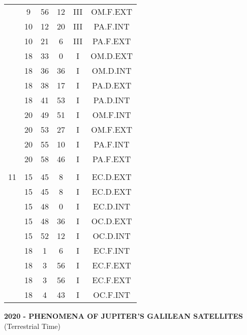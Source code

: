 \documentclass[12pt, a4paper]{article}
\begin{document}
\begin{multicols}{3}
{\begin{tabular}{c c c c c c}
	 	 	 	 & 9 & 56 & 12 & III & OM.F.EXT\\%
	 	 	 	 & 10 & 12 & 20 & III & PA.F.INT\\%
	 	 	 	 & 10 & 21 & 6 & III & PA.F.EXT\\%
	 	 	 	 & 18 & 33 & 0 & I & OM.D.EXT\\%
	 	 	 	 & 18 & 36 & 36 & I & OM.D.INT\\%
	 	 	 	 & 18 & 38 & 17 & I & PA.D.EXT\\%
	 	 	 	 & 18 & 41 & 53 & I & PA.D.INT\\%
	 	 	 	 & 20 & 49 & 51 & I & OM.F.INT\\%
	 	 	 	 & 20 & 53 & 27 & I & OM.F.EXT\\%
	 	 	 	 & 20 & 55 & 10 & I & PA.F.INT\\%
	 	 	 	 & 20 & 58 & 46 & I & PA.F.EXT\\%
	 	 	 	 & & & & & \\%
	 	 	 	11 & 15 & 45 & 8 & I & EC.D.EXT\\%
	 	 	 	 & 15 & 45 & 8 & I & EC.D.EXT\\%
	 	 	 	 & 15 & 48 & 0 & I & EC.D.INT\\%
	 	 	 	 & 15 & 48 & 36 & I & OC.D.EXT\\%
	 	 	 	 & 15 & 52 & 12 & I & OC.D.INT\\%
	 	 	 	 & 18 & 1 & 6 & I & EC.F.INT\\%
	 	 	 	 & 18 & 3 & 56 & I & EC.F.EXT\\%
	 	 	 	 & 18 & 3 & 56 & I & EC.F.EXT\\%
	 	 	 	 & 18 & 4 & 43 & I & OC.F.INT\\%
	 	 \end{tabular}
 	}
\end{multicols}
\pagebreak
\textbf{2020 - PHENOMENA OF JUPITER'S GALILEAN SATELLITES}\\(Terrestrial Time) 
\end{document}
